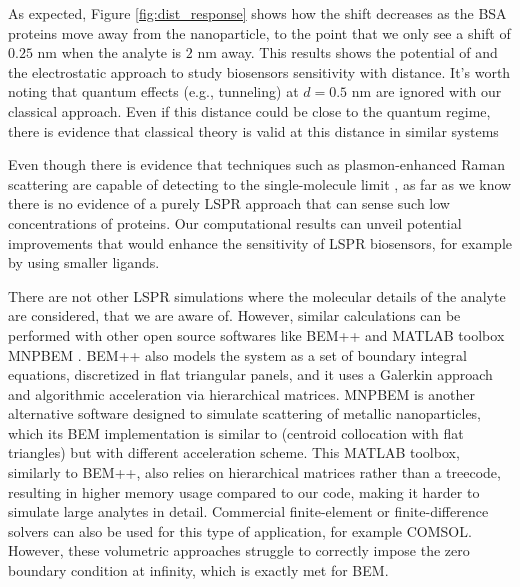 As expected, Figure \ref{fig:dist_response} shows how the shift decreases as the BSA 
proteins move away from the nanoparticle, to the point that we only see a shift of 
$0.25$ nm when the analyte is $2$ nm away. This results shows the potential of \pygbe 
and the electrostatic approach to study biosensors sensitivity with distance. It's 
worth noting that quantum effects (e.g., tunneling) at $d=0.5$ nm are ignored with 
our classical approach. Even if this distance could be close to the quantum regime, 
there is evidence that classical theory is valid at this distance in similar systems
\cite{SavageETal2012, EstebanETal2012}

Even though there is evidence that techniques such as plasmon-enhanced Raman 
scattering are capable of detecting to the single-molecule limit 
\cite{ZhangZhangETal2013}, as far as we know there is no evidence of a purely
LSPR approach that can sense such low concentrations of proteins. Our 
computational results can unveil potential improvements that would enhance 
the sensitivity of LSPR biosensors, for example by using smaller ligands. 

There are not other LSPR simulations where the molecular details of the analyte 
are considered, that we are aware of. However, similar calculations can be 
performed with other open source softwares like BEM++ \cite{SmigajETal2015} and 
MATLAB toolbox MNPBEM \cite{HohenesterTrugler2012}. BEM++ also models the system
as a set of boundary integral equations, discretized in flat triangular panels, 
and it uses a Galerkin approach and algorithmic acceleration via hierarchical 
matrices. MNPBEM is another alternative software designed to simulate scattering
of metallic nanoparticles, which its BEM implementation is similar to \pygbe 
(centroid collocation with flat triangles) but with different acceleration scheme.
This MATLAB toolbox, similarly to BEM++, also relies on hierarchical matrices 
rather than a treecode, resulting in higher memory usage compared to our code, 
making it harder to simulate large analytes in detail. 
Commercial finite-element or finite-difference solvers can also be used for this
type of application, for example COMSOL. However, these volumetric approaches 
struggle to correctly impose the zero boundary condition at infinity, which is
exactly met for BEM.  
